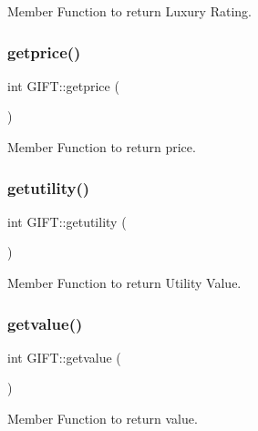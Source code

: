 Member Function to return Luxury Rating. 

\mbox{\label{class_g_i_f_t_a19425237ca27e9582d8e0a4573ef92c6}} 
\subsubsection{\texorpdfstring{getprice()}{getprice()}}
{\footnotesize\ttfamily int G\+I\+F\+T\+::getprice (\begin{DoxyParamCaption}{ }\end{DoxyParamCaption})}



Member Function to return price. 

\mbox{\label{class_g_i_f_t_abebe17aa357b6b91b1893c54030b3fe2}} 
\subsubsection{\texorpdfstring{getutility()}{getutility()}}
{\footnotesize\ttfamily int G\+I\+F\+T\+::getutility (\begin{DoxyParamCaption}{ }\end{DoxyParamCaption})}



Member Function to return Utility Value. 

\mbox{\label{class_g_i_f_t_a5d9dd7971200e465b5d476cca993f734}} 
\subsubsection{\texorpdfstring{getvalue()}{getvalue()}}
{\footnotesize\ttfamily int G\+I\+F\+T\+::getvalue (\begin{DoxyParamCaption}{ }\end{DoxyParamCaption})}



Member Function to return value. 

\mbox{\label{class_g_i_f_t_a5b03bf798de4b0716fb4438ce2b44f20}} 
